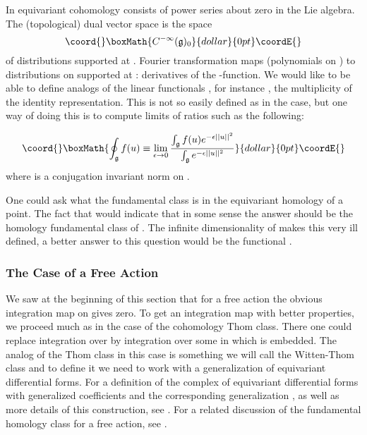 \documentclass[a4paper,a4paper]{article}
\theoremstyle{conjecture}
\begin{document}
In equivariant cohomology \coordHE{} consists of power series about
zero in the Lie algebra. The (topological) dual vector space is the space
$$\coord{}\boxMath{C^{-\infty}(\mathfrak g)_0}{dollar}{0pt}\coordE{}$$
of distributions supported at \coordHE{}.  Fourier transformation maps \coordHE{} 
(polynomials on \coordHE{}) to distributions on \coordHE{} supported at \coordHE{}: derivatives
of the \myHighlight{$\delta$}\coordHE{}-function.  We would like to be able to define analogs of the
linear functionals \coordHE{}, for instance \coordHE{}, the multiplicity of the
identity representation.  This is not so easily defined as in the \coordHE{} case, but
one way of doing this is to compute limits of ratios such as the following:

$$\coord{}\boxMath{\oint_{\mathfrak g} f(u)\equiv\lim_{\epsilon\rightarrow 0} \frac{\int_{\mathfrak g} f(u) e^{-\epsilon ||u||^2}} 
{\int_{\mathfrak g}e^{-\epsilon ||u||^2}}}{dollar}{0pt}\coordE{}$$
where \myHighlight{$||\cdot||$}\coordHE{} is a conjugation invariant norm on \coordHE{}.

One could ask what the fundamental class is in the equivariant homology of a point.  The fact
that \coordHE{} would indicate that in some sense the answer should be the homology fundamental
class of \coordHE{}.  The infinite dimensionality of \coordHE{} makes this very ill defined, a better answer
to this question would be the functional \coordHE{}.

\subsubsection{The Case of a Free Action}

We saw at the beginning of this section that for a free action the obvious
integration map \coordHE{} on \coordHE{} gives zero.  To get an integration
map with better properties, we proceed much as in the case of the cohomology
Thom class. There one could replace integration over \coordHE{} by integration
over some \coordHE{} in which \coordHE{} is embedded.  
The analog of the Thom class in this
case is something we will call the Witten-Thom class \cite{Witten-localization} and to define it we need
to work with a generalization of equivariant differential forms.  For a 
definition of the complex \coordHE{} of equivariant differential
forms with generalized coefficients and the corresponding generalization \coordHE{}, as
well as more details of this construction, see 
\cite{Kumar-Vergne}.  For a related discussion of the fundamental homology class for a free action, 
see \cite{Austin-Braam}.
\end{document}
